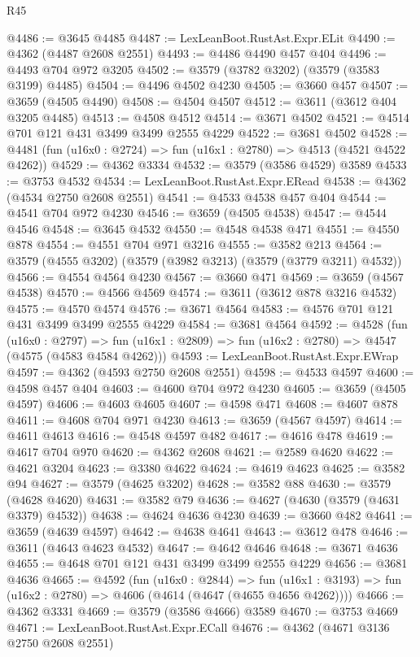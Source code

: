 \begin{lexlean}{R45}
\begin{coremodule}
@4486 := @3645 @4485
@4487 := LexLeanBoot.RustAst.Expr.ELit
@4490 := @4362 (@4487 @2608 @2551)
@4493 := @4486 @4490 @457 @404
@4496 := @4493 @704 @972 @3205
@4502 := @3579 (@3782 @3202) (@3579 (@3583 @3199) @4485)
@4504 := @4496 @4502 @4230
@4505 := @3660 @457
@4507 := @3659 (@4505 @4490)
@4508 := @4504 @4507
@4512 := @3611 (@3612 @404 @3205 @4485)
@4513 := @4508 @4512
@4514 := @3671 @4502
@4521 := @4514 @701 @121 @431 @3499 @3499 @2555 @4229
@4522 := @3681 @4502
@4528 := @4481 (fun (u16x0 : @2724) => fun (u16x1 : @2780) => @4513 (@4521 @4522 @4262))
@4529 := @4362 @3334
@4532 := @3579 (@3586 @4529) @3589
@4533 := @3753 @4532
@4534 := LexLeanBoot.RustAst.Expr.ERead
@4538 := @4362 (@4534 @2750 @2608 @2551)
@4541 := @4533 @4538 @457 @404
@4544 := @4541 @704 @972 @4230
@4546 := @3659 (@4505 @4538)
@4547 := @4544 @4546
@4548 := @3645 @4532
@4550 := @4548 @4538 @471
@4551 := @4550 @878
@4554 := @4551 @704 @971 @3216
@4555 := @3582 @213
@4564 := @3579 (@4555 @3202) (@3579 (@3982 @3213) (@3579 (@3779 @3211) @4532))
@4566 := @4554 @4564 @4230
@4567 := @3660 @471
@4569 := @3659 (@4567 @4538)
@4570 := @4566 @4569
@4574 := @3611 (@3612 @878 @3216 @4532)
@4575 := @4570 @4574
@4576 := @3671 @4564
@4583 := @4576 @701 @121 @431 @3499 @3499 @2555 @4229
@4584 := @3681 @4564
@4592 := @4528
    (fun (u16x0 : @2797) =>
    fun (u16x1 : @2809) => fun (u16x2 : @2780) => @4547 (@4575 (@4583 @4584 @4262)))
@4593 := LexLeanBoot.RustAst.Expr.EWrap
@4597 := @4362 (@4593 @2750 @2608 @2551)
@4598 := @4533 @4597
@4600 := @4598 @457 @404
@4603 := @4600 @704 @972 @4230
@4605 := @3659 (@4505 @4597)
@4606 := @4603 @4605
@4607 := @4598 @471
@4608 := @4607 @878
@4611 := @4608 @704 @971 @4230
@4613 := @3659 (@4567 @4597)
@4614 := @4611 @4613
@4616 := @4548 @4597 @482
@4617 := @4616 @478
@4619 := @4617 @704 @970
@4620 := @4362 @2608
@4621 := @2589 @4620
@4622 := @4621 @3204
@4623 := @3380 @4622
@4624 := @4619 @4623
@4625 := @3582 @94
@4627 := @3579 (@4625 @3202)
@4628 := @3582 @88
@4630 := @3579 (@4628 @4620)
@4631 := @3582 @79
@4636 := @4627 (@4630 (@3579 (@4631 @3379) @4532))
@4638 := @4624 @4636 @4230
@4639 := @3660 @482
@4641 := @3659 (@4639 @4597)
@4642 := @4638 @4641
@4643 := @3612 @478
@4646 := @3611 (@4643 @4623 @4532)
@4647 := @4642 @4646
@4648 := @3671 @4636
@4655 := @4648 @701 @121 @431 @3499 @3499 @2555 @4229
@4656 := @3681 @4636
@4665 := @4592
    (fun (u16x0 : @2844) =>
    fun (u16x1 : @3193) => fun (u16x2 : @2780) => @4606 (@4614 (@4647 (@4655 @4656 @4262))))
@4666 := @4362 @3331
@4669 := @3579 (@3586 @4666) @3589
@4670 := @3753 @4669
@4671 := LexLeanBoot.RustAst.Expr.ECall
@4676 := @4362 (@4671 @3136 @2750 @2608 @2551)

\end{coremodule}
\end{lexlean}
